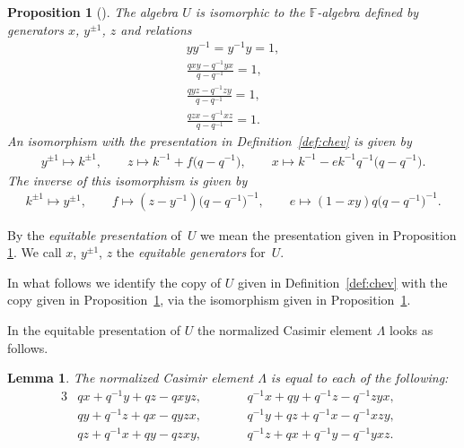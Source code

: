 \documentclass[pdftex]{sigma}
\numberwithin{equation}{section}
\newtheorem{Lemma}[Theorem]{Lemma}
\newtheorem{Proposition}[Theorem]{Proposition}
{\theoremstyle{definition}
\newtheorem{Note}[Theorem]{Note}
\newtheorem{Definition}[Theorem]{Definition}
\newtheorem{Problem}[Theorem]{Problem}
}
\begin{document}
\begin{Proposition}[]
\label{prop:equit}
The algebra
$U$ is isomorphic to the
$\mathbb F$-algebra defined by generators
$x$, $y^{\pm 1}$, $z$ and relations
\begin{gather}
 y y^{-1} = y^{-1} y  = 1,
\label{eq:eq0}
\\
 \frac{qxy-q^{-1}yx}{q-q^{-1}} = 1,
\label{eq:eq1}
\\
 \frac{qyz-q^{-1}zy}{q-q^{-1}} = 1,
\label{eq:eq2}
\\
 \frac{qzx-q^{-1}xz}{q-q^{-1}} = 1.
\label{eq:eq3}
\end{gather}
An isomorphism with the presentation in
Definition~{\rm \ref{def:chev}} is given by
\begin{gather*}
 y^{\pm 1} \mapsto k^{\pm 1},
\qquad
 z \mapsto k^{-1} + f\big(q-q^{-1}\big),
\qquad
 x \mapsto k^{-1} - ek^{-1}q^{-1}\big(q-q^{-1}\big).
\end{gather*}
The inverse of this isomorphism is given by
\begin{gather*}
 k^{\pm 1} \mapsto y^{\pm 1},
\qquad
 f\mapsto (z-y^{-1})\big(q-q^{-1}\big)^{-1},
\qquad
 e\mapsto (1-xy)q\big(q-q^{-1}\big)^{-1}.
\end{gather*}
\end{Proposition}


\begin{Definition}
By the {\it equitable presentation} of~$U$ we mean the
presentation given in Proposition
\ref{prop:equit}. We call $x$, $y^{\pm 1}$, $z$ the
{\it equitable generators} for~$U$.
\end{Definition}


\begin{Note}
\label{note:ident}
In what follows we identify the copy of
$U$ given in
Def\/inition~\ref{def:chev}
with
the copy given in
Proposition~\ref{prop:equit},
via the isomorphism given in
Proposition~\ref{prop:equit}.
\end{Note}


In the equitable presentation
of $U$
the normalized Casimir element $\Lambda$ looks as follows.

\begin{Lemma}
\label{lem:sixforms}
The normalized Casimir element $\Lambda$ is equal to each of
the following:
\begin{alignat}{3}
& qx+q^{-1}y+qz-qxyz,
\qquad &&
q^{-1}x+qy+q^{-1}z-q^{-1}zyx, &
\label{eq:v1}
\\
& qy+q^{-1}z+qx-qyzx,
\qquad &&
q^{-1}y+qz+q^{-1}x-q^{-1}xzy,&
\label{eq:v2}
\\
& qz+q^{-1}x+qy-qzxy,
\qquad &&
q^{-1}z+qx+q^{-1}y-q^{-1}yxz.&
\label{eq:v3}
\end{alignat}
\end{Lemma}
\end{document}
